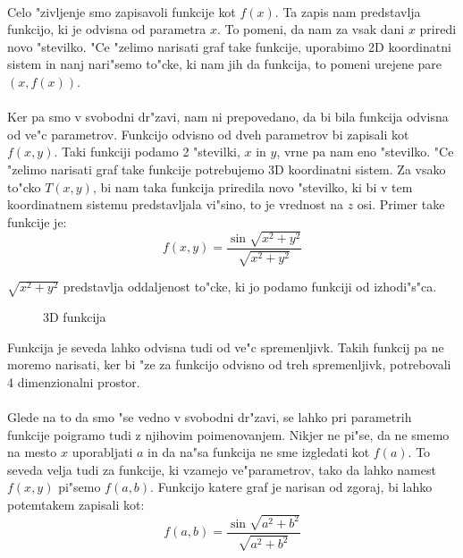 \paragraph{}
Celo "zivljenje smo zapisavoli funkcije kot $f(x)$. Ta zapis nam predstavlja funkcijo, ki je odvisna od parametra $x$. To pomeni, da nam za vsak dani $x$ priredi novo "stevilko. "Ce "zelimo narisati graf take funkcije, uporabimo 2D koordinatni sistem in nanj nari"semo to"cke, ki nam jih da funkcija, to pomeni urejene pare $(x, f(x))$.

\paragraph{}
Ker pa smo v svobodni dr"zavi, nam ni prepovedano, da bi bila funkcija odvisna od ve"c parametrov. Funkcijo odvisno od dveh parametrov bi zapisali kot $f(x,y)$. Taki funkciji podamo 2 "stevilki, $x$ in $y$, vrne pa nam eno "stevilko. "Ce "zelimo narisati graf take funkcije potrebujemo 3D koordinatni sistem. Za vsako to"cko $T(x,y)$, bi nam taka funkcija priredila novo "stevilko, ki bi v tem koordinatnem sistemu predstavljala vi"sino, to je vrednost na $z$ osi. Primer take funkcije je:
\[f(x,y) = \frac{\sin \sqrt{x^2 + y^2}}{\sqrt{x^2 + y^2}} \]

$\sqrt{x^2 + y^2}$ predstavlja oddaljenost to"cke, ki jo podamo funkciji od izhodi"s"ca.

\begin{figure}[h!]
	\centering
	\caption{3D funkcija}
\end{figure}

Funkcija je seveda lahko odvisna tudi od ve"c spremenljivk. Takih funkcij pa ne moremo narisati, ker bi "ze za funkcijo odvisno od treh spremenljivk, potrebovali 4 dimenzionalni prostor.

\paragraph{}
Glede na to da smo "se vedno v svobodni dr"zavi, se lahko pri parametrih funkcije poigramo tudi z njihovim poimenovanjem. Nikjer ne pi"se, da ne smemo na mesto $x$ uporabljati $a$ in da na"sa funkcija ne sme izgledati kot $f(a)$. To seveda velja tudi za funkcije, ki vzamejo ve"parametrov, tako da lahko namest $f(x,y)$ pi"semo $f(a,b)$. Funkcijo katere graf je narisan od zgoraj, bi lahko potemtakem zapisali kot:
\[f(a,b) = \frac{\sin \sqrt{a^2 + b^2}}{\sqrt{a^2 + b^2}} \]

